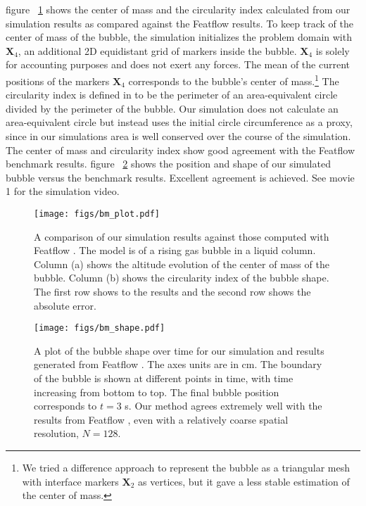 \documentclass{jfm}
\begin{document}
figure ~\ref{fig:bm_plot} shows the center of mass and the circularity index calculated from our simulation results as compared against the Featflow results. To keep track of the center of mass of the bubble, the simulation initializes the problem domain with $\bm{X}_4$, an additional 2D equidistant grid of markers inside the bubble. $\bm{X}_4$ is solely for accounting purposes and does not exert any forces. The mean of the current positions of the markers $\bm{X}_4$ corresponds to the bubble's center of mass.\footnote{We tried a difference approach to represent the bubble as a triangular mesh with interface markers $\bm{X}_2$ as vertices, but it gave a less stable estimation of the center of mass.} The circularity index is defined in \citet{turek2021numerical} to be the perimeter of an area-equivalent circle divided by the perimeter of the bubble. Our simulation does not calculate an area-equivalent circle but instead uses the initial circle circumference as a proxy, since in our simulations area is well conserved over the course of the simulation. The center of mass and circularity index show good agreement with the Featflow benchmark results. figure ~\ref{fig:bm_shape} shows the position and shape of our simulated bubble versus the benchmark results. Excellent agreement is achieved. See movie 1 for the simulation video.

\begin{figure}
\centering
\texttt{[image: figs/bm\_plot.pdf]}
\caption{A comparison of our simulation results against those computed with Featflow \citep{turek2021numerical}. The model is of a rising gas bubble in a liquid column. Column (a) shows the altitude evolution of the center of mass of the bubble. Column (b) shows the circularity index of the bubble shape. The first row shows to the results and the second row shows the absolute error.}
\label{fig:bm_plot}
\end{figure}
\begin{figure}
\centering
\texttt{[image: figs/bm\_shape.pdf]}
\caption{A plot of the bubble shape over time for our simulation and results generated from Featflow \citep{turek2021numerical}. The axes units are in cm. The boundary of the bubble is shown at different points in time, with time increasing from bottom to top. The final bubble position corresponds to $t = 3$ s. Our method agrees extremely well with the results from Featflow \citep{turek2021numerical}, even with a relatively coarse spatial resolution, $N=128$. }
\label{fig:bm_shape}
\end{figure}
\end{document}
